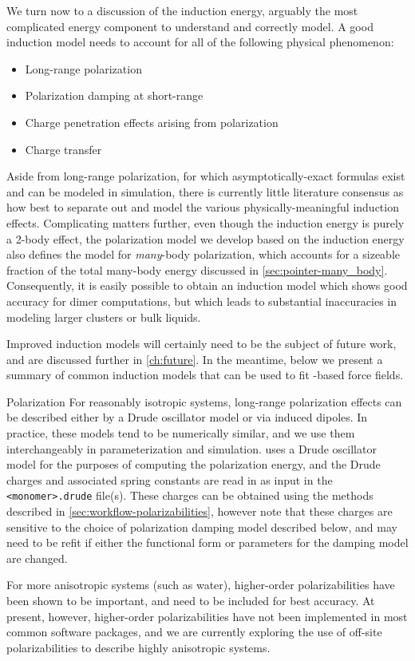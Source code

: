 We turn now to a discussion of the \sapt induction energy, arguably the most
complicated energy component to understand and correctly model. A good
induction model needs to account for all of the following physical phenomenon:
\begin{itemize}
\item Long-range polarization
\item Polarization damping at short-range
\item Charge penetration effects arising from polarization
\item Charge transfer
\end{itemize}
Aside from long-range polarization, for which asymptotically-exact formulas
exist and can be modeled in simulation,\cite{Rick2002,Holt2008,Misquitta2007a,Misquitta2008b} 
there is currently little literature consensus as how best to separate out and
model the various physically-meaningful induction effects. Complicating matters further,
even though the \sapt induction energy is purely a 2-body effect, the
polarization model we develop based on the induction energy also defines
the model for \emph{many}-body polarization, which accounts for a sizeable
fraction of the total many-body energy discussed in \cref{sec:pointer-many_body}.
Consequently, it is easily possible to obtain an induction model which shows good
accuracy for dimer computations, but which leads to substantial inaccuracies
in modeling larger clusters or bulk liquids.

Improved induction models will certainly need to be the subject of future work,
and are discussed further in \cref{ch:future}. In the meantime, below we present a summary of
common induction models that can be used to fit \sapt-based force fields.

\begin{paragraph}{Polarization}
For reasonably isotropic systems, long-range polarization effects can be described
either by a Drude oscillator model or via induced
dipoles.\cite{Rick2002,Lopes2009} In practice, these models tend to be
numerically similar, and we use them interchangeably in parameterization and
simulation.\footnotemark{} \pointer uses a Drude oscillator model for the
purposes of computing the polarization energy, and the Drude charges and
associated spring constants are read in as input in the \verb|<monomer>.drude|
file(s). These charges can be obtained using the methods described in
\cref{sec:workflow-polarizabilities}, however note that these charges are
sensitive to the choice of polarization damping model described below, and may
need to be refit if either the functional form or parameters for the damping
model are changed.

For more anisotropic systems (such as water), higher-order polarizabilities
have been shown to be important, and need to be included for best
accuracy.\cite{Cisneros2016,Misquitta2008b,Misquitta2016,Welch2008}
At present, however, higher-order polarizabilities have not been implemented
in most common software packages, and we are currently exploring the use of
off-site polarizabilities to describe highly anisotropic systems.
\end{paragraph}

